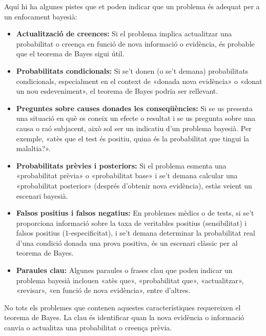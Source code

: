 \documentclass[12pt]{article}
\begin{document}
\begin{concept} [title=Com reconeixer els problemes del teorema de Bayes?] \noindent Aquí hi ha algunes pistes que et poden indicar que un problema és adequat per a un enfocament bayesià:

\begin{itemize}
    \item \textbf{Actualització de creences:} Si el problema implica actualitzar una probabilitat o creença en funció de nova informació o evidència, és probable que el teorema de Bayes sigui útil.
    \item \textbf{Probabilitats condicionals:} Si se't donen (o se't demana) probabilitats condicionals, especialment en el context de «donada nova evidència» o «donat un nou esdeveniment», el teorema de Bayes podria ser rellevant.
    \item \textbf{Preguntes sobre causes donades les conseqüències:} Si se us presenta una situació en què es coneix un efecte o resultat i se us pregunta sobre una causa o raó subjacent, això sol ser un indicatiu d'un problema bayesià. Per exemple, «atès que el test és positiu, quina és la probabilitat que tingui la malaltia?».
    \item \textbf{Probabilitats prèvies i posteriors:} Si el problema esmenta una «probabilitat prèvia» o «probabilitat base» i se't demana calcular una «probabilitat posterior» (després d'obtenir nova evidència), estàs veient un escenari bayesià.
    \item \textbf{Falsos positius i falsos negatius:} En problemes mèdics o de tests, si se't proporciona informació sobre la taxa de veritables positius (sensibilitat) i falsos positius (1-especificitat), i se't demana determinar la probabilitat real d'una condició donada una prova positiva, és un escenari clàssic per al teorema de Bayes.
    \item \textbf{Paraules clau:} Algunes paraules o frases clau que poden indicar un problema bayesià inclouen «atès que», «probabilitat que», «actualitzar», «revisar», «en funció de nova evidència», entre d'altres.
\end{itemize}

No tots els problemes que contenen aquestes característiques requereixen el teorema de Bayes. La clau és identificar quan la nova evidència o informació canvia o actualitza una probabilitat o creença prèvia. 
\end{concept}
\end{document}
